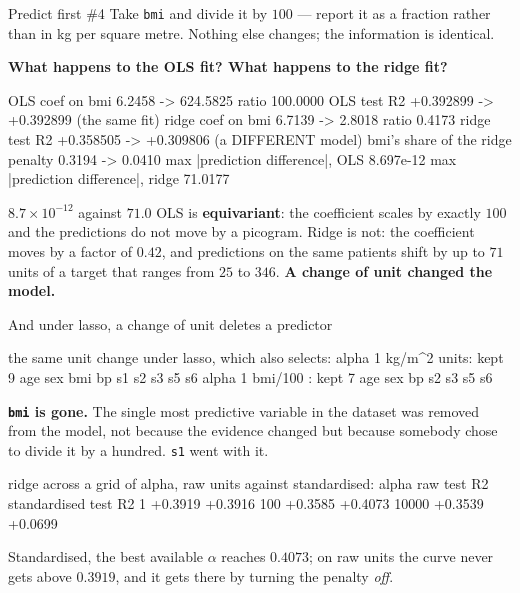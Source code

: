 \documentclass[aspectratio=169]{beamer}
\begin{document}
\begin{frame}[fragile,shrink=8]{Predict first \#4}
Take \texttt{bmi} and divide it by $100$ --- report it as a fraction rather
than in kg per square metre. Nothing else changes; the information is
identical.

\begin{center}
  \textbf{What happens to the OLS fit? What happens to the ridge fit?}
\end{center}
\vspace{0.2em}
\begin{outblk}
     OLS   coef on bmi       6.2458 ->     624.5825   ratio   100.0000
     OLS   test R2     +0.392899 -> +0.392899   (the same fit)
     ridge coef on bmi       6.7139 ->       2.8018   ratio     0.4173
     ridge test R2     +0.358505 -> +0.309806   (a DIFFERENT model)
     bmi's share of the ridge penalty  0.3194 -> 0.0410
     max |prediction difference|, OLS   8.697e-12
     max |prediction difference|, ridge 71.0177
\end{outblk}
\begin{alertblock}{$8.7\times10^{-12}$ against $71.0$}
  \footnotesize OLS is \textbf{equivariant}: the coefficient scales by exactly
  $100$ and the predictions do not move by a picogram. Ridge is not: the
  coefficient moves by a factor of $0.42$, and predictions on the same
  patients shift by up to $71$ units of a target that ranges from $25$ to
  $346$. \textbf{A change of unit changed the model.}
\end{alertblock}
\end{frame}

\begin{frame}[fragile,shrink=8]{And under lasso, a change of unit deletes a predictor}
\begin{outblk}
  the same unit change under lasso, which also selects:
     alpha 1  kg/m^2 units: kept 9  age sex bmi bp s1 s2 s3 s5 s6
     alpha 1  bmi/100    : kept 7  age sex bp s2 s3 s5 s6
\end{outblk}
\begin{center}\small
  \textbf{\texttt{bmi} is gone.} The single most predictive variable in the
  dataset was removed from the model, not because the evidence changed but
  because somebody chose to divide it by a hundred. \texttt{s1} went with it.
\end{center}
\begin{outblk}
  ridge across a grid of alpha, raw units against standardised:
        alpha     raw test R2   standardised test R2
              1      +0.3919            +0.3916
            100      +0.3585            +0.4073
          10000      +0.3539            +0.0699
\end{outblk}
\begin{center}\small
  Standardised, the best available $\alpha$ reaches $0.4073$; on raw units the
  curve never gets above $0.3919$, and it gets there by turning the penalty
  \emph{off}.
\end{center}
\end{frame}
\end{document}
